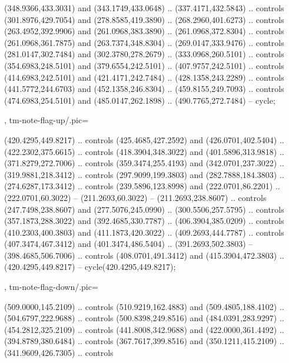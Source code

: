 {{\begin{scope}[y=-0.80pt,x=0.80pt,scale=0.038,yshift=270pt,xshift=-303pt]
        (348.9366,433.3031) and (343.1749,433.0648) .. (337.4171,432.5843) .. controls
        (301.8976,429.7054) and (278.8585,419.3890) .. (268.2960,401.6273) .. controls
        (263.4952,392.9906) and (261.0968,383.3890) .. (261.0968,372.8304) .. controls
        (261.0968,361.7875) and (263.7374,348.8304) .. (269.0147,333.9476) .. controls
        (281.0147,302.7484) and (302.3780,278.2679) .. (333.0968,260.5101) .. controls
        (354.6983,248.5101) and (379.6554,242.5101) .. (407.9757,242.5101) .. controls
        (414.6983,242.5101) and (421.4171,242.7484) .. (428.1358,243.2289) .. controls
        (441.5772,244.6703) and (452.1358,246.8304) .. (459.8155,249.7093) .. controls
        (474.6983,254.5101) and (485.0147,262.1898) .. (490.7765,272.7484) --
        cycle;
    \end{scope}
  },
  tm-note-flag-up/.pic={
    \begin{scope}[y=-0.80pt,x=0.80pt,scale=0.038,xshift=-173pt,yshift=48pt]
       (420.4295,449.8217) .. controls
        (425.4685,427.2592) and (426.0701,402.5404) .. (422.2302,375.6615) .. controls
        (418.3904,348.3022) and (401.5896,313.9818) .. (371.8279,272.7006) .. controls
        (359.3474,255.4193) and (342.0701,237.3022) .. (319.9881,218.3412) .. controls
        (297.9099,199.3803) and (282.7888,184.3803) .. (274.6287,173.3412) .. controls
        (239.5896,123.8998) and (222.0701,86.2201) .. (222.0701,60.3022) --
        (211.2693,60.3022) -- (211.2693,238.8607) .. controls (247.7498,238.8607) and
        (277.5076,245.0990) .. (300.5506,257.5795) .. controls (357.1873,288.3022) and
        (392.4685,330.7787) .. (406.3904,385.0209) .. controls (410.2303,400.3803) and
        (411.1873,420.3022) .. (409.2693,444.7787) .. controls (407.3474,467.3412) and
        (401.3474,486.5404) .. (391.2693,502.3803) -- (398.4685,506.7006) .. controls
        (408.0701,491.3412) and (415.3904,472.3803) .. (420.4295,449.8217) --
        cycle(420.4295,449.8217);
    \end{scope}
  },
  tm-note-flag-down/.pic={
    \begin{scope}[y=-0.80pt,x=0.80pt,scale=0.038,xshift=-228pt,yshift=430pt]
       (509.0000,145.2109) .. controls
        (510.9219,162.4883) and (509.4805,188.4102) .. (504.6797,222.9688) .. controls
        (500.8398,249.8516) and (484.0391,283.9297) .. (454.2812,325.2109) .. controls
        (441.8008,342.9688) and (422.0000,361.4492) .. (394.8789,380.6484) .. controls
        (367.7617,399.8516) and (350.1211,415.2109) .. (341.9609,426.7305) .. controls

\end{scope}}}
